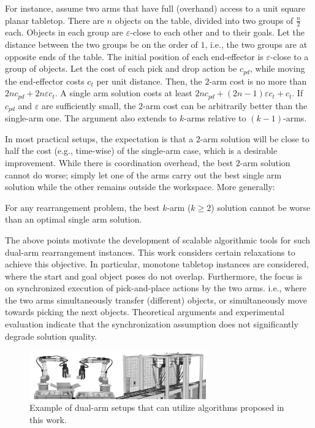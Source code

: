For instance, assume two arms that have full (overhand) access to a 
unit square planar tabletop. There are $n$ objects on the table, 
divided into two groups of $\frac{n}{2}$ each. Objects in each group 
are $\varepsilon$-close to each other and to their goals. Let the 
distance between the two groups be on the order of $1$, i.e., the two 
groups are at opposite ends of the table. The initial position of each 
end-effector is $\varepsilon$-close to a group of objects. Let the cost 
of each pick and drop action be $c_{pd}$, while moving the 
end-effector costs $c_t$ per unit distance. Then, the $2$-arm 
cost is no more than $2nc_{pd} + 2n\varepsilon c_t $.  A single arm 
solution costs at least $2nc_{pd} + (2n-1)\varepsilon c_t + 
c_t$. If $c_{pd}$ and $\varepsilon$ are sufficiently small, the $2$-arm 
cost can be arbitrarily better than the single-arm one. The argument 
also extends to $k$-arms relative to $(k-1)$-arms.

In most practical setups, the expectation is that a $2$-arm solution
will be close to half the cost (e.g., time-wise) of the single-arm 
case, which is a desirable improvement. While there 
is coordination overhead, the best $2$-arm solution cannot do worse; simply 
let one of the arms carry out the best single arm solution while the 
other remains outside the workspace. More generally:

\vspace{-.1in}
\begin{lemma}\label{l:2-arm-no-worse}
For any rearrangement problem, the best $k$-arm ($k \ge 2$) solution
cannot be worse than an optimal single arm solution.
\vspace{-.1in}
\end{lemma}

The above points motivate the development of scalable algorithmic
tools for such dual-arm rearrangement instances. This work considers
certain relaxations to achieve this objective. In particular,
monotone tabletop instances are considered, where the start and goal
object poses do not overlap.  Furthermore, the focus is on
synchronized execution of pick-and-place actions by the two arms. i.e., where the two arms simultaneously transfer (different) objects, or simultaneously move towards picking the next objects.
Theoretical arguments and experimental evaluation indicate that the
synchronization assumption does not significantly degrade solution
quality.

\begin{figure}[t]\vspace{-0.15in}
	\centering
	\includegraphics[width=3in]{figures/two_arms}\vspace{-0.1in}
	\caption{Example of dual-arm setups that can utilize
	algorithms proposed in this work.}
	\label{fig:two_arms}\vspace{-0.25in}
\end{figure}



